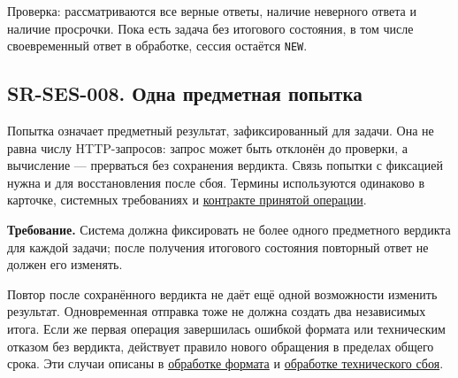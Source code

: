\documentclass[12pt,a4paper]{article}
\begin{document}
Проверка: рассматриваются все верные ответы, наличие неверного ответа и наличие просрочки. Пока есть задача без итогового состояния, в том числе своевременный ответ в обработке, сессия остаётся \texttt{NEW}.

\subsection{SR-SES-008. Одна предметная попытка}\label{sr-ses-008-ux43eux434ux43dux430-ux43fux440ux435ux434ux43cux435ux442ux43dux430ux44f-ux43fux43eux43fux44bux442ux43aux430}

\hypertarget{sr-ses-008-одна-предметная-попытка}{}

Попытка означает предметный результат, зафиксированный для задачи. Она не равна числу HTTP-запросов: запрос может быть отклонён до проверки, а вычисление --- прерваться без сохранения вердикта. Связь попытки с фиксацией нужна и для восстановления после сбоя. Термины используются одинаково в карточке, системных требованиях и \href{../07_\%D0\%9F\%D1\%80\%D0\%BE\%D0\%B3\%D1\%80\%D0\%B0\%D0\%BC\%D0\%BC\%D0\%BD\%D1\%8B\%D0\%B5_\%D1\%82\%D1\%80\%D0\%B5\%D0\%B1\%D0\%BE\%D0\%B2\%D0\%B0\%D0\%BD\%D0\%B8\%D1\%8F/DOC-06.2_\%D0\%A1\%D0\%B5\%D1\%81\%D1\%81\%D0\%B8\%D0\%B8_\%D0\%B7\%D0\%B0\%D0\%B4\%D0\%B0\%D1\%87_\%D0\%B8_\%D0\%BF\%D0\%BB\%D0\%B0\%D0\%BD\%D0\%B8\%D1\%80\%D0\%BE\%D0\%B2\%D1\%89\%D0\%B8\%D0\%BA.pdf\#nameddest=\%D0\%BF\%D1\%80\%D0\%B8\%D0\%BD\%D1\%8F\%D1\%82\%D0\%B0\%D1\%8F-\%D0\%BE\%D0\%B1\%D1\%80\%D0\%B0\%D0\%B1\%D0\%BE\%D1\%82\%D0\%BA\%D0\%B0-\%D0\%B8-\%D0\%B2\%D0\%BE\%D1\%81\%D1\%81\%D1\%82\%D0\%B0\%D0\%BD\%D0\%BE\%D0\%B2\%D0\%BB\%D0\%B5\%D0\%BD\%D0\%B8\%D0\%B5}{контракте принятой операции}.

\textbf{Требование.} Система должна фиксировать не более одного предметного вердикта для каждой задачи; после получения итогового состояния повторный ответ не должен его изменять.

Повтор после сохранённого вердикта не даёт ещё одной возможности изменить результат. Одновременная отправка тоже не должна создать два независимых итога. Если же первая операция завершилась ошибкой формата или техническим отказом без вердикта, действует правило нового обращения в пределах общего срока. Эти случаи описаны в \hyperref[sr-ses-009-ux43eux448ux438ux431ux43aux430-ux444ux43eux440ux43cux430ux442ux430]{обработке формата} и \hyperref[sr-ses-010-ux442ux435ux445ux43dux438ux447ux435ux441ux43aux438ux439-ux441ux431ux43eux439-ux43fux440ux43eux432ux435ux440ux43aux438]{обработке технического сбоя}.
\end{document}

